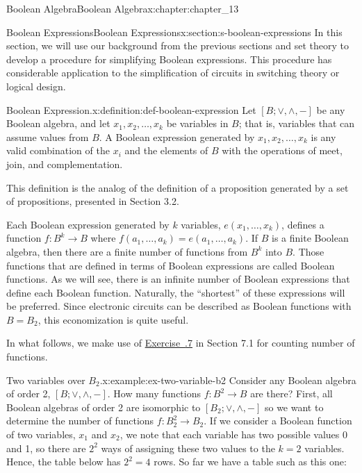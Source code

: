 \documentclass[oneside,10pt,]{book}
\newcommand{\xreffont}{\relax}
\numberwithin{equation}{section}
\begin{document}
\begin{chapterptx}{Boolean Algebra}{}{Boolean Algebra}{}{}{x:chapter:chapter_13}
%
%
\typeout{************************************************}
\typeout{************************************************}
%
\begin{sectionptx}{Boolean Expressions}{}{Boolean Expressions}{}{}{x:section:s-boolean-expressions}
%
In this section, we will use our background from the previous sections and set theory to develop a procedure for simplifying Boolean expressions. This procedure has considerable application to the simplification of circuits in switching theory or logical design.%
\begin{definition}{Boolean Expression.}{x:definition:def-boolean-expression}%
%
Let  \([B; \lor , \land, - ]\) be any Boolean algebra, and let \(x_1, x_2,
\ldots , x_k\) be variables in \(B\); that is, variables that can assume values from \(B\). A Boolean expression generated by  \(x_1, x_2, \ldots , x_k\) is any valid combination of the \(x_i\) and the elements of \(B\) with the operations of meet, join, and complementation.%
\end{definition}
This definition is the analog of the definition of a proposition generated by a set of propositions, presented in Section 3.2.%
\par
Each Boolean expression generated by \(k\) variables, \(e\left(x_1, \ldots , x_k\right)\), defines a function \(f: B^k \to B\) where \(f\left(a_1,\ldots , a_k\right)=e\left(a_1, \ldots , a_k\right)\). If \(B\) is a finite Boolean algebra, then there are a finite number of functions from \(B^k\) into \(B\). Those functions that are defined in terms of Boolean expressions are called Boolean functions.  As we will see, there is an infinite number of Boolean expressions that define each Boolean function. Naturally, the ``shortest'' of these expressions will be preferred. Since electronic circuits can be described as Boolean functions with \(B=B_2\), this economization is quite useful.%
\par
In what follows, we make use of  \hyperlink{x:exercise:exercise-counting-functions}{Exercise~{\xreffont 7.1.7}} in Section 7.1 for counting number of functions.%
\begin{example}{Two variables over \(B_2\).}{x:example:ex-two-variable-b2}%
Consider any Boolean algebra of order 2, \([B; \lor, \land, - ]\). How many functions \(f:B^2\to B\) are there? First, all Boolean algebras of order 2 are isomorphic to \(\left[B_2; \lor , \land, - \right]\) so we want to determine the number of functions \(f:B_2^2\to B_2\). If we consider a Boolean function of two variables, \(x_1\) and \(x_2\), we note that each variable has two possible values 0 and 1, so there are \(2^2\) ways of assigning these two values to the \(k=2\) variables. Hence, the table below has \(2^2=4\) rows. So far we have a table such as this one:%

\end{example}
\end{sectionptx}
\end{chapterptx}
\end{document}
